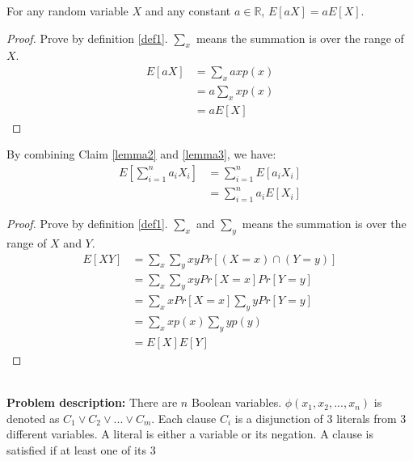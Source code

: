 \begin{lemma}\label{lemma3}
For any random variable $X$ and any constant $a \in \mathbb{R}$, $E[aX]=aE[X]$.
\end{lemma}
\begin{proof}
Prove by definition \ref{def1}.
$\sum_x$ means the summation is over the range of $X$.
\begin{align}
    \nonumber E[aX]&=\sum_xaxp(x) %
    \\
    \nonumber &=a\sum_xxp(x)%
    \\
    \nonumber &=aE[X]
\end{align}
\end{proof}
By combining Claim \ref{lemma2} and \ref{lemma3}, we have:
\begin{align}
    \nonumber E[\sum_{i=1}^na_iX_i]&=\sum_{i=1}^nE[a_iX_i]\\
    \nonumber&=\sum_{i=1}^{n}a_iE[X_i]
\end{align}
\begin{proof}
Prove by definition \ref{def1}.
$\sum_x$ and $\sum_y$ means the summation is over the range of $X$ and $Y$.
\begin{align}
    \nonumber E[XY]&=\sum_x\sum_yxyPr[(X=x)\cap(Y=y)]\\
    \nonumber &=\sum_x\sum_yxyPr[X=x]Pr[Y=y]\\
    \nonumber&=\sum_xxPr[X=x]\sum_yyPr[Y=y]\\
    \nonumber&=\sum_xxp(x)\sum_yyp(y)\\
    \nonumber&=E[X]E[Y]
\end{align}
\end{proof}
\noindent{}\\
\textbf{Problem description:} There are $n$ Boolean variables. $\phi(x_1,x_2,...,x_n)$ is denoted as $C_1 \vee C_2 \vee...\vee C_m$. Each clause $C_i$ is a disjunction of $3$ literals from $3$ different variables. A literal is either a variable or its negation. A clause is satisfied if at least one of its $3$
